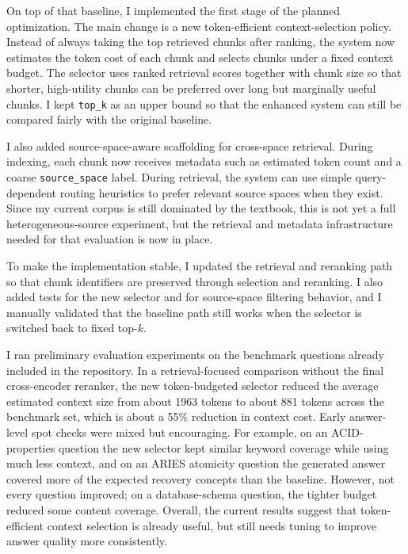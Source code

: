 \documentclass[10pt,twocolumn]{article}
\begin{document}
On top of that baseline, I implemented the first stage of the planned optimization. The main change is a new token-efficient context-selection policy. Instead of always taking the top retrieved chunks after ranking, the system now estimates the token cost of each chunk and selects chunks under a fixed context budget. The selector uses ranked retrieval scores together with chunk size so that shorter, high-utility chunks can be preferred over long but marginally useful chunks. I kept \texttt{top\_k} as an upper bound so that the enhanced system can still be compared fairly with the original baseline.

I also added source-space-aware scaffolding for cross-space retrieval. During indexing, each chunk now receives metadata such as estimated token count and a coarse \texttt{source\_space} label. During retrieval, the system can use simple query-dependent routing heuristics to prefer relevant source spaces when they exist. Since my current corpus is still dominated by the textbook, this is not yet a full heterogeneous-source experiment, but the retrieval and metadata infrastructure needed for that evaluation is now in place.

To make the implementation stable, I updated the retrieval and reranking path so that chunk identifiers are preserved through selection and reranking. I also added tests for the new selector and for source-space filtering behavior, and I manually validated that the baseline path still works when the selector is switched back to fixed top-$k$.

I ran preliminary evaluation experiments on the benchmark questions already included in the repository. In a retrieval-focused comparison without the final cross-encoder reranker, the new token-budgeted selector reduced the average estimated context size from about 1963 tokens to about 881 tokens across the benchmark set, which is about a 55\% reduction in context cost. Early answer-level spot checks were mixed but encouraging. For example, on an ACID-properties question the new selector kept similar keyword coverage while using much less context, and on an ARIES atomicity question the generated answer covered more of the expected recovery concepts than the baseline. However, not every question improved; on a database-schema question, the tighter budget reduced some content coverage. Overall, the current results suggest that token-efficient context selection is already useful, but still needs tuning to improve answer quality more consistently.
\end{document}
